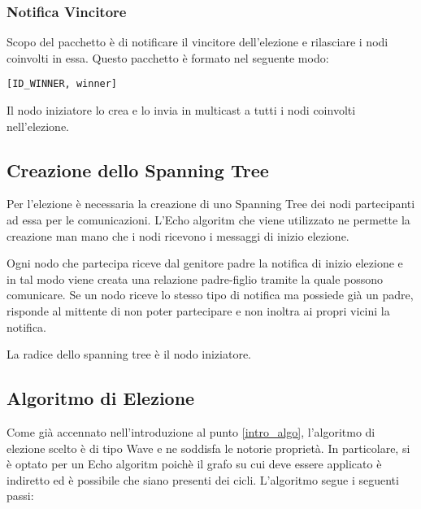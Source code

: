\subsubsection{Notifica Vincitore}\label{pacchetto_vincitore}
Scopo del pacchetto è di notificare il vincitore dell'elezione e rilasciare i nodi coinvolti in essa. Questo pacchetto è formato nel seguente modo:

\begin{lstlisting}
[ID_WINNER, winner]
\end{lstlisting}

Il nodo iniziatore lo crea e lo invia in multicast a tutti i nodi coinvolti nell'elezione.

\subsection{Creazione dello Spanning Tree}

Per l'elezione è necessaria la creazione di uno Spanning Tree dei nodi partecipanti ad essa per le comunicazioni. L'Echo algoritm che viene utilizzato ne permette la creazione man mano che i nodi ricevono i messaggi di inizio elezione.

Ogni nodo che partecipa riceve dal genitore padre la notifica di inizio elezione e in tal modo viene creata una relazione padre-figlio tramite la quale possono comunicare. Se un nodo riceve lo stesso tipo di notifica ma possiede già un padre, risponde al mittente di non poter partecipare e non inoltra ai propri vicini la notifica.

La radice dello spanning tree è il nodo iniziatore.

\subsection{Algoritmo di Elezione}

Come già accennato nell'introduzione al punto \ref{intro_algo}, l'algoritmo di elezione scelto è di tipo Wave e ne soddisfa le notorie proprietà. In particolare, si è optato per un Echo algoritm poichè il grafo su cui deve essere applicato è indiretto ed è possibile che siano presenti dei cicli.
L'algoritmo segue i seguenti passi:

